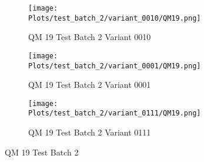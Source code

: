\documentclass{DissertateFigs}
\begin{document}
\begin{figure}[t!]
\medskip

    \begin{subfigure}{0.47\textwidth}
    \texttt{[image: Plots/test\_batch\_2/variant\_0010/QM19.png]}
    \caption{QM 19 Test Batch 2 Variant 0010}
    \end{subfigure}
    \begin{subfigure}{0.47\textwidth}
    \texttt{[image: Plots/test\_batch\_2/variant\_0001/QM19.png]}
    \caption{QM 19 Test Batch 2 Variant 0001}
    \end{subfigure}

\medskip

    \begin{subfigure}{0.47\textwidth}
    \texttt{[image: Plots/test\_batch\_2/variant\_0111/QM19.png]}
    \caption{QM 19 Test Batch 2 Variant 0111}
    \end{subfigure}
\caption{QM 19 Test Batch 2}
    \end{figure}
\clearpage
\end{document}
